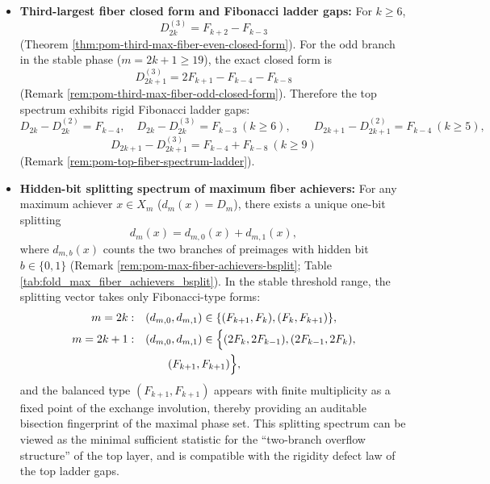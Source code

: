 \begin{enumerate}
\begin{itemize}
    \item \textbf{Third-largest fiber closed form and Fibonacci ladder gaps:} For \(k\ge 6\),
    \[
    D_{2k}^{(3)}=F_{k+2}-F_{k-3}
    \]
    (Theorem \ref{thm:pom-third-max-fiber-even-closed-form}).
    For the odd branch in the stable phase (\(m=2k+1\ge 19\)), the exact closed form is
    \[
    D_{2k+1}^{(3)}=2F_{k+1}-F_{k-4}-F_{k-8}
    \]
    (Remark \ref{rem:pom-third-max-fiber-odd-closed-form}).
    Therefore the top spectrum exhibits rigid Fibonacci ladder gaps:
    \[
    D_{2k}-D_{2k}^{(2)}=F_{k-4},\quad D_{2k}-D_{2k}^{(3)}=F_{k-3}\ (k\ge 6),
    \qquad
    D_{2k+1}-D_{2k+1}^{(2)}=F_{k-4}\ (k\ge 5),
    \]
    \[
    D_{2k+1}-D_{2k+1}^{(3)}=F_{k-4}+F_{k-8}\ (k\ge 9)
    \]
    (Remark \ref{rem:pom-top-fiber-spectrum-ladder}).

    \item \textbf{Hidden-bit splitting spectrum of maximum fiber achievers:} For any maximum achiever \(x\in X_m\) (\(d_m(x)=D_m\)), there exists a unique one-bit splitting
    \[
    d_m(x)=d_{m,0}(x)+d_{m,1}(x),
    \]
    where \(d_{m,b}(x)\) counts the two branches of preimages with hidden bit \(b\in\{0,1\}\) (Remark \ref{rem:pom-max-fiber-achievers-bsplit}; Table \ref{tab:fold_max_fiber_achievers_bsplit}).
    In the stable threshold range, the splitting vector takes only Fibonacci-type forms:
    \[
    \begin{aligned}
    m=2k:\quad &(d_{m,0},d_{m,1})\in\{(F_{k+1},F_k),(F_k,F_{k+1})\},\\
    m=2k+1:\quad &(d_{m,0},d_{m,1})\in
    \Bigl\{(2F_k,2F_{k-1}), (2F_{k-1},2F_k),\\
    &\qquad (F_{k+1},F_{k+1})\Bigr\},
    \end{aligned}
    \]
    and the balanced type \((F_{k+1},F_{k+1})\) appears with finite multiplicity as a fixed point of the exchange involution, thereby providing an auditable bisection fingerprint of the maximal phase set.
    This splitting spectrum can be viewed as the minimal sufficient statistic for the ``two-branch overflow structure'' of the top layer, and is compatible with the rigidity defect law of the top ladder gaps.


\end{itemize}
\end{enumerate}
